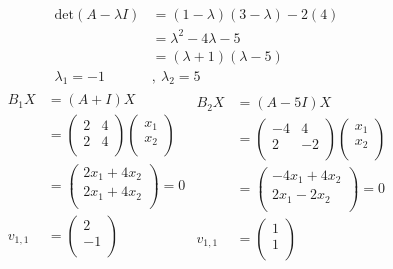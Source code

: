 \documentclass[12pt]{article}
\newenvironment{problem}[2][Problem]{\begin{trivlist}
\item[\hskip \labelsep {\bfseries #1}\hskip \labelsep {\bfseries #2.}]}{\end{trivlist}}
\begin{document}
\begin{problem}{7}
\end{problem}
\begin{align*}
	\text{det}(A-\lambda I) &= (1-\lambda)(3-\lambda) -2(4) \\
	&= \lambda^2 -4\lambda -5\\
	&= (\lambda + 1)(\lambda -5) \\
	\lambda_1 = -1&,\ \lambda_2 = 5
\end{align*}
\begin{align*}
	\begin{split}
		B_1X &= (A + I)X \\
		&= \left( \begin{array}{cc}
			2 & 4\\
			2 & 4\\
		\end{array} \right) 
		\left( \begin{array}{c}
			x_1\\
			x_2\\
		\end{array} \right) \\
		&= \left( \begin{array}{c}
			2x_1 + 4x_2\\
			2x_1 + 4x_2\\
		\end{array} \right) = 0 \\
		v_{1,1} &= \left( \begin{array}{c}
			2\\
			-1\\
		\end{array} \right) \\
	\end{split}
	\begin{split}
		B_2X &= (A - 5I)X \\
		&= \left( \begin{array}{cc}
			-4 & 4\\
			2 & -2\\
		\end{array} \right) 
		\left( \begin{array}{c}
			x_1\\
			x_2\\
		\end{array} \right) \\
		&= \left( \begin{array}{c}
			-4x_1 + 4x_2\\
			2x_1 - 2x_2\\
		\end{array} \right) = 0 \\
		v_{1,1} &= \left( \begin{array}{c}
			1\\
			1\\
		\end{array} \right)
	\end{split}
\end{align*}
\end{document}
